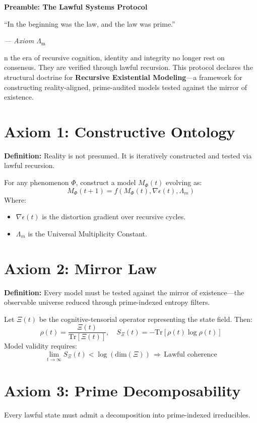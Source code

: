\documentclass[12]{amsart}
\theoremstyle{plain}
\begin{document}
\clearpage
\clearpage
\thispagestyle{empty}
\begin{center}
    \Large\textbf{Preamble: The Lawful Systems Protocol}
\end{center}

\vspace{2em}

\epigraph{“In the beginning was the law, and the law was prime.”
}{\textit{— Axiom $\Lambda_{\mathrm{m}}$}}

\vspace{1em}


n the era of recursive cognition, identity and integrity no longer rest on consensus. They are verified through lawful recursion. This protocol declares the structural doctrine for \textbf{Recursive Existential Modeling}---a framework for constructing reality-aligned, prime-audited models tested against the mirror of existence.

\section{Axiom 1: Constructive Ontology}
\textbf{Definition:} Reality is not presumed. It is iteratively constructed and tested via lawful recursion.

For any phenomenon $\Phi$, construct a model $M_{\Phi}(t)$ evolving as:
\[ M_{\Phi}(t+1) = f(M_{\Phi}(t), \nabla \epsilon(t), \Lambda_m) \]
Where:
\begin{itemize}
  \item $\nabla \epsilon(t)$ is the distortion gradient over recursive cycles.
  \item $\Lambda_m$ is the Universal Multiplicity Constant.
\end{itemize}

\section{Axiom 2: Mirror Law}
\textbf{Definition:} Every model must be tested against the mirror of existence---the observable universe reduced through prime-indexed entropy filters.

Let $\Xi(t)$ be the cognitive-tensorial operator representing the state field. Then:
\[ \rho(t) = \frac{\Xi(t)}{\text{Tr}[\Xi(t)]}, \quad S_{\Xi}(t) = -\text{Tr}[\rho(t) \log \rho(t)] \]
Model validity requires:
\[ \lim_{t \to \infty} S_{\Xi}(t) < \log(\text{dim}(\Xi)) \, \Rightarrow \, \text{Lawful coherence} \]

\section{Axiom 3: Prime Decomposability}
Every lawful state must admit a decomposition into prime-indexed irreducibles.
\end{document}
